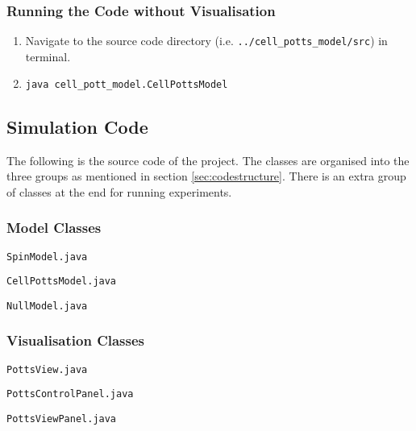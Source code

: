 \documentclass[a4paper,12pt]{article}
\newcommand*{\MyPath}{/Users/MichaelChiang/Dropbox/Edinburgh/Courses/Year 3/SH_Project/cell_potts_model}%
\begin{document}
\subsubsection{Running the Code without Visualisation}
\begin{enumerate}
\item Navigate to the source code directory (i.e. \texttt{../cell\_potts\_model/src}) in terminal.
\item 
\begin{lstlisting}[language=bash, basicstyle={\small\ttfamily}]
java cell_pott_model.CellPottsModel 
\end{lstlisting}
\end{enumerate}

\subsection{Simulation Code}
\label{app:sourcecode}
The following is the source code of the project. The classes are organised into the three groups as mentioned in section \ref{sec:codestructure}. There is an extra group of classes at the end for running experiments.

\subsubsection{Model Classes}

\noindent\texttt{SpinModel.java}

\vspace*{0.5cm}
\noindent\texttt{CellPottsModel.java}

\vspace*{0.5cm}
\noindent\texttt{NullModel.java}


\subsubsection{Visualisation Classes}

\noindent\texttt{PottsView.java}

\vspace*{0.5cm}
\noindent\texttt{PottsControlPanel.java}

\vspace*{0.5cm}
\noindent\texttt{PottsViewPanel.java}

\end{document}
